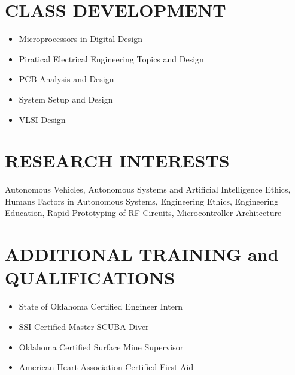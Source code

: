 \documentclass[line]{res} %
\begin{document}
\begin{resume}
\section{CLASS DEVELOPMENT} 
\vspace{8pt} %

\begin{itemize}
\item Microprocessors in Digital Design
\item Piratical Electrical Engineering Topics and Design
\item PCB Analysis and Design
\item System Setup and Design
\item VLSI Design
\end{itemize}

\vspace{0.2in} %

\section{RESEARCH INTERESTS} 
\vspace{-5pt} %

\begin{center}
Autonomous Vehicles,
Autonomous Systems and Artificial Intelligence Ethics,
Humans Factors in Autonomous Systems,
Engineering Ethics,
Engineering Education,
Rapid Prototyping of RF Circuits,
Microcontroller Architecture
\end{center} 
\vspace{0.2in} %

\section{ADDITIONAL TRAINING and QUALIFICATIONS} 

\begin{itemize}
\item    State of Oklahoma Certified Engineer Intern
\item    SSI Certified Master SCUBA Diver
\item    Oklahoma Certified Surface Mine Supervisor
\item    American Heart Association Certified First Aid
\end{itemize} 
\end{resume} 
\end{document}

